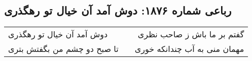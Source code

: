 \begin{center}
\section*{رباعی شماره ۱۸۷۶: دوش آمد آن خیال تو رهگذری}
\label{sec:1876}
\begin{longtable}{l p{0.5cm} r}
دوش آمد آن خیال تو رهگذری
&&
گفتم بر ما باش ز صاحب نظری
\\
تا صبح دو چشم من بگفتش بتری
&&
مهمان منی به آب چندانکه خوری
\\
\end{longtable}
\end{center}
